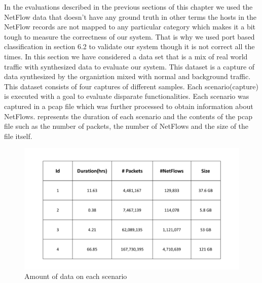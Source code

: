 In the evaluations described in the previous sections of this chapter we used the NetFlow data that doesn't have any ground truth in other terms the hosts in the NetFlow records are not mapped to any particular category which makes it a bit tough to measure the correctness of our system. That is why we used port based classification in section 6.2 to validate our system though it is not correct all the times. In this section we have considered a data set that is a mix of real world traffic with synthesized data to evaluate our system. This dataset is a capture of data synthesized by the organiztion mixed with normal and background traffic. This dataset consists of four captures of different samples. Each scenario(capture) is executed with a goal to evaluate disparate functionalities. Each scenario was captured in a pcap file which was further processed to obtain information about NetFlows.  represents the duration of each scenario and the contents of the pcap file such as the number of packets, the number of NetFlows and the size of the file itself. 

\begin{figure}[b]
	\centerline{\includegraphics[trim=3cm 3cm 3cm 3cm, scale = 0.7]{synth_desc.pdf}}
	\caption{Amount of data on each scenario}%
\end{figure}

